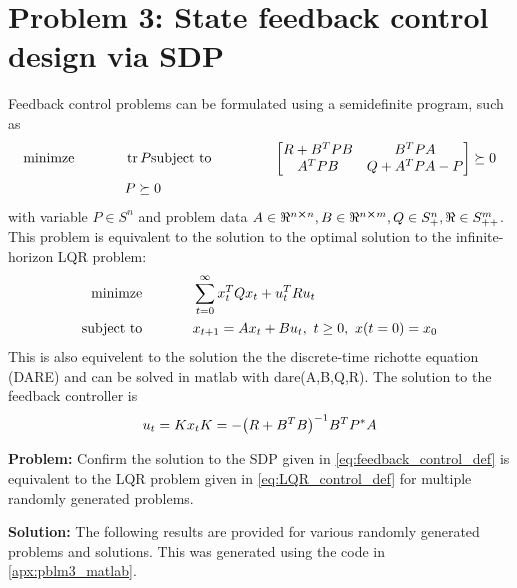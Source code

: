 \documentclass[letter]{article}
\begin{document}
\newpage
\section{Problem 3: State feedback control design via SDP}
Feedback control problems can be formulated using a semidefinite program, such as
\begin{equation}\label{eq:feedback_control_def}
	\begin{aligned}
		\text{minimze} \hspace{0.5in}& \trace{P}
		\text{subject to} \hspace{0.5in}
		& \mqty [R + B^T PB & B^T PA\\
				 A^T PB & Q + A^T P A - P] \succeq 0\\
				 & P \succeq 0
	\end{aligned}
\end{equation}
with variable $P \in S^n$ and problem data $A\in \real^{n\cross n}, B \in\real^{n\cross m}, Q \in S^n_+, \real \in S^m_{++}$.\\

This problem is equivalent to the solution to the optimal solution to the infinite-horizon LQR problem:
\begin{equation}\label{eq:LQR_control_def}
	\begin{aligned}
		\text{minimze} \hspace{0.5in}& \sum_{t=0}^\infty x_t^T Q x_t + u_t^T R u_t\\
		\text{subject to} \hspace{0.5in}
		& x_{t+1} = Ax_t + B u_t, \ t \geq 0, \ x(t=0) = x_0
	\end{aligned}
\end{equation}
This is also equivelent to the solution the the discrete-time richotte equation (DARE) and can be solved in matlab with dare(A,B,Q,R). The solution to the feedback controller is
\begin{equation}\label{eq:LQR_control_solution}
	u_t = K x_t\\
	K = -\qty(R + B^T B)^{-1} B^T P^* A
\end{equation}

\textbf{Problem:}
Confirm the solution to the SDP given in \eqref{eq:feedback_control_def} is equivalent to the LQR problem given in \eqref{eq:LQR_control_def} for multiple randomly generated problems.

\textbf{Solution:}
The following results are provided for various randomly generated problems and solutions. This was generated using the code in \appendixname \ref{apx:pblm3_matlab}.
\end{document}
